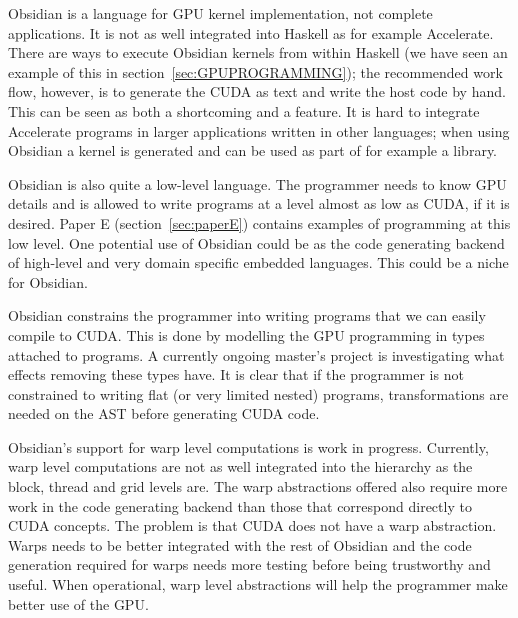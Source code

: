 \documentclass[a4paper]{book}
\begin{document}
Obsidian is a language for GPU kernel implementation, not complete applications. 
It is not as well integrated into Haskell as for example Accelerate. There are 
ways to execute Obsidian kernels from within Haskell (we have seen an example of this in 
section~\ref{sec:GPUPROGRAMMING}); the recommended work flow, 
however, is to generate the CUDA as text and write the host code by hand. This 
can be seen as both a shortcoming and a feature. It is hard to integrate 
Accelerate programs in larger applications written in other languages; when 
using Obsidian a kernel is generated and can be used as part of for example a library.  

Obsidian is also quite a low-level language. The programmer needs to know GPU details 
and is allowed to write programs at a level almost as low as CUDA, if it is desired. 
Paper E (section~\ref{sec:paperE}) contains examples of programming at this low level. 
One potential use of Obsidian could be as the code generating backend of high-level 
and very domain specific embedded languages. This could be a niche for Obsidian.  

Obsidian constrains the programmer into writing programs that we can easily compile to 
CUDA. This is done by modelling the GPU programming in types attached to programs. A 
currently ongoing master's project is investigating what effects removing these 
types have. It is clear that if the programmer is not constrained to writing flat 
(or very limited nested) programs, transformations are needed on the AST before 
generating CUDA code. 

Obsidian's support for warp level computations is work in progress. Currently, warp level 
computations are not as well integrated into the hierarchy as the block, thread and grid 
levels are. The warp abstractions 
offered also require more work in the code generating backend than those 
that correspond directly to CUDA concepts. The problem is that CUDA does not have 
a warp abstraction. Warps needs to be better integrated with the rest of Obsidian 
and the code generation required for warps needs more testing before being 
trustworthy and useful. When operational, warp level abstractions will help 
the programmer make better use of the GPU. 



%
%
\end{document}
